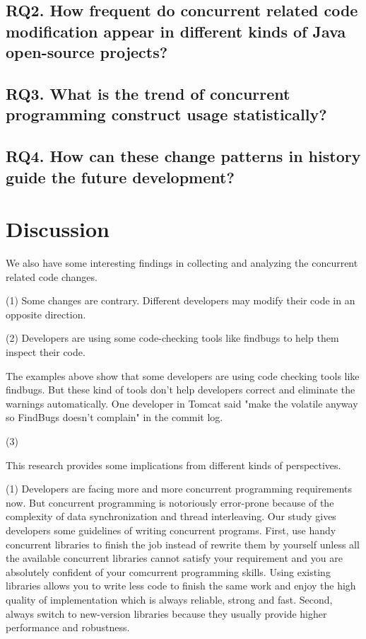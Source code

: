 \documentclass[conference]{IEEEtran}
\begin{document}
\subsection{RQ2. How frequent do concurrent related code modification appear in different kinds of Java open-source projects?}

\subsection{RQ3. What is the trend of concurrent programming construct usage statistically?}

\subsection{RQ4. How can these change patterns in history guide the future development?}

\section{Discussion}
We also have some interesting findings in collecting and analyzing the concurrent related code changes.

(1) Some changes are contrary. Different developers may modify their code in an opposite direction.

(2) Developers are using some code-checking tools like findbugs to help them inspect their code.

The examples above show that some developers are using code checking tools like findbugs. But these kind of tools don't help developers correct and eliminate the warnings automatically. One developer in Tomcat said "make the volatile anyway so FindBugs doesn't complain" in the commit log.


(3) 

This research provides some implications from different kinds of perspectives.

(1) Developers are facing more and more concurrent programming requirements now. But concurrent programming is notoriously error-prone because of the complexity of data synchronization and thread interleaving. Our study gives developers some guidelines of writing concurrent programs. First, use handy concurrent libraries to finish the job instead of rewrite them by yourself unless all the available concurrent libraries cannot satisfy your requirement and you are absolutely confident of your comcurrent programming skills. Using existing libraries allows you to  write less code to finish the same work and enjoy the high quality of implementation which is always reliable, strong and fast. Second, always switch to new-version libraries because they usually provide higher performance and robustness.
\end{document}
